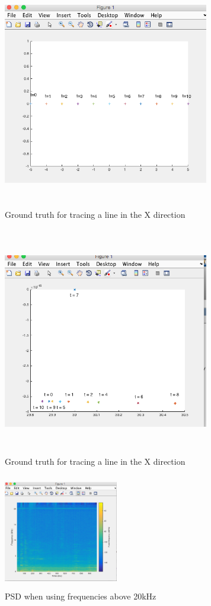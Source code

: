 \documentclass{acm_proc_article-sp}
\begin{document}
\begin{figure}[h]
\caption{Ground truth for tracing a line in the X direction}
\includegraphics[width=9cm, height=10cm]{groundX}
\end{figure}

\begin{figure}[h]
\caption{Ground truth for tracing a line in the X direction}
\includegraphics[width=9cm, height=10cm]{x}
\end{figure}

\begin{figure}[h]
\caption{PSD when using frequencies above 20kHz}
\center
\includegraphics[width=5cm, height=5cm]{above20}
\end{figure}
\end{document}
